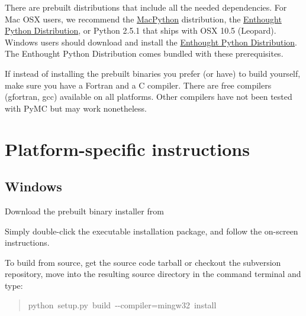 There are prebuilt distributions that include all the needed dependencies. For 
Mac OSX users, we recommend the \href{http://www.activestate.com/Products/ActivePython/}{MacPython} distribution, the 
\href{http://www.enthought.com/products/epddownload.php}{Enthought Python Distribution}, or Python 2.5.1 that ships with 
OSX 10.5 (Leopard). Windows users should download and install the 
\href{http://www.enthought.com/products/epddownload.php}{Enthought Python Distribution}. The Enthought Python Distribution comes 
bundled with these prerequisites.

If instead of installing the prebuilt binaries you prefer (or have) to build 
 yourself, make sure you have a Fortran and a C compiler. There are free
compilers (gfortran, gcc) available on all platforms. Other compilers have not been
tested with PyMC but may work nonetheless.



\hypertarget{platform-specific-instructions}{}
\section*{Platform-specific instructions}



\hypertarget{windows}{}
\subsection*{Windows}
\begin{list}{.}
{
\setlength{\rightmargin}{\leftmargin}
}
\item {} 
Download the prebuilt binary installer from

\item {} 
Simply double-click the executable installation package, and follow the on-screen instructions.

\end{list}

To build from source, get the source code tarball or checkout the subversion
repository, move into the resulting source directory in the command terminal 
and type:
\begin{quote}{\ttfamily \raggedright \noindent
python~setup.py~build~-{}-compiler=mingw32~install
}\end{quote}

